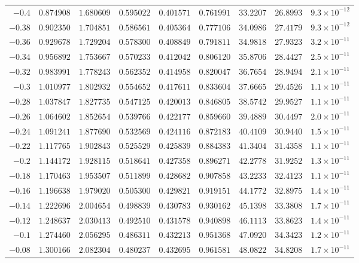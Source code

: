 \documentclass[12pt]{extarticle}
\theoremstyle{plain}
\theoremstyle{remark}
\begin{document}
{\begin{longtable}{rcccccccc}
$-0.4$ & $0.874908$ & $1.680609$ & $0.595022$ & $0.401571$ & $0.761991$ & $33.2207$ & $26.8993$ & $9.3\times10^{-12}$ \\
$-0.38$ & $0.902350$ & $1.704851$ & $0.586561$ & $0.405364$ & $0.777106$ & $34.0986$ & $27.4179$ & $9.3\times10^{-12}$ \\
$-0.36$ & $0.929678$ & $1.729204$ & $0.578300$ & $0.408849$ & $0.791811$ & $34.9818$ & $27.9323$ & $3.2\times10^{-11}$ \\
$-0.34$ & $0.956892$ & $1.753667$ & $0.570233$ & $0.412042$ & $0.806120$ & $35.8706$ & $28.4427$ & $2.5\times10^{-11}$ \\
$-0.32$ & $0.983991$ & $1.778243$ & $0.562352$ & $0.414958$ & $0.820047$ & $36.7654$ & $28.9494$ & $2.1\times10^{-11}$ \\
$-0.3$ & $1.010977$ & $1.802932$ & $0.554652$ & $0.417611$ & $0.833604$ & $37.6665$ & $29.4526$ & $1.1\times10^{-11}$ \\
$-0.28$ & $1.037847$ & $1.827735$ & $0.547125$ & $0.420013$ & $0.846805$ & $38.5742$ & $29.9527$ & $1.1\times10^{-11}$ \\
$-0.26$ & $1.064602$ & $1.852654$ & $0.539766$ & $0.422177$ & $0.859660$ & $39.4889$ & $30.4497$ & $2.0\times10^{-11}$ \\
$-0.24$ & $1.091241$ & $1.877690$ & $0.532569$ & $0.424116$ & $0.872183$ & $40.4109$ & $30.9440$ & $1.5\times10^{-11}$ \\
$-0.22$ & $1.117765$ & $1.902843$ & $0.525529$ & $0.425839$ & $0.884383$ & $41.3404$ & $31.4358$ & $1.1\times10^{-11}$ \\
$-0.2$ & $1.144172$ & $1.928115$ & $0.518641$ & $0.427358$ & $0.896271$ & $42.2778$ & $31.9252$ & $1.3\times10^{-11}$ \\
$-0.18$ & $1.170463$ & $1.953507$ & $0.511899$ & $0.428682$ & $0.907858$ & $43.2233$ & $32.4123$ & $1.1\times10^{-11}$ \\
$-0.16$ & $1.196638$ & $1.979020$ & $0.505300$ & $0.429821$ & $0.919151$ & $44.1772$ & $32.8975$ & $1.4\times10^{-11}$ \\
$-0.14$ & $1.222696$ & $2.004654$ & $0.498839$ & $0.430783$ & $0.930162$ & $45.1398$ & $33.3808$ & $1.7\times10^{-11}$ \\
$-0.12$ & $1.248637$ & $2.030413$ & $0.492510$ & $0.431578$ & $0.940898$ & $46.1113$ & $33.8623$ & $1.4\times10^{-11}$ \\
$-0.1$ & $1.274460$ & $2.056295$ & $0.486311$ & $0.432213$ & $0.951368$ & $47.0920$ & $34.3423$ & $1.2\times10^{-11}$ \\
$-0.08$ & $1.300166$ & $2.082304$ & $0.480237$ & $0.432695$ & $0.961581$ & $48.0822$ & $34.8208$ & $1.7\times10^{-11}$ \\

\end{longtable}}
\end{document}
